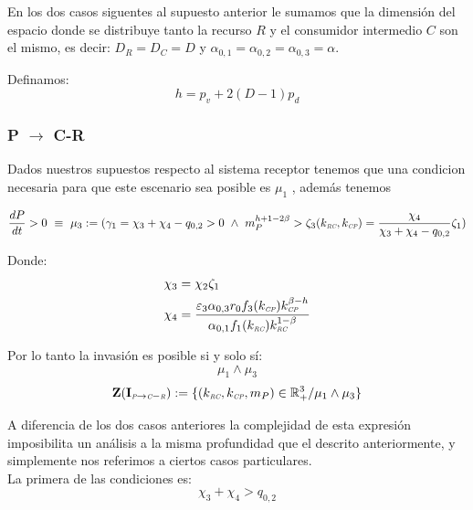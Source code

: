 En los dos casos siguentes al supuesto anterior le sumamos que la dimensi\'on del espacio donde se distribuye tanto la recurso $R$ y el consumidor intermedio $C$ son el mismo, es decir: $D_R = D_C = D$ y $\alpha_{0,1} = \alpha_{0,2} = \alpha_{0,3} = \alpha$.

Definamos:
\begin{equation}
  h = p_v + 2(D-1)p_d
\end{equation}

\subsubsection{P $\to$ C-R}
Dados nuestros supuestos respecto al sistema receptor tenemos que una condicion necesaria para que este escenario sea posible es $\mu_1$ , adem\'as tenemos

\begin{equation}
  \frac{dP}{dt}  >0 \ \equiv \  \mu_3 := (\gamma_1 = \chi_3 + \chi_4 - q_{0,2} >0 \ \land \ m_P^{h + 1 - 2\beta} > \zeta_3(k_{\textit{\tiny RC}},k_{\textit{\tiny CP}}) = \frac{\chi_4}{\chi_3 + \chi_4 - q_{0,2}}\zeta_1)
\end{equation}

Donde:
\begin{equation}\label{eq:3rdCond}
  \begin{aligned}
    \chi_3 &= \chi_2 \zeta_1 \\
    \chi_4 &= \frac{\varepsilon_3 \alpha_{0,3}r_0 f_3(k_{\textit{\tiny CP}})k_{\textit{\tiny CP}}^{\beta - h}}{\alpha_{0,1}f_1(k_{\textit{\tiny RC}})k_{\textit{\tiny RC}}^{1-\beta}}
  \end{aligned}
\end{equation}

Por lo tanto la invasi\'on es posible si y solo s\'i:
\begin{equation}
  \mu_1 \land \mu_3
\end{equation}
\begin{equation}
\mathbf{Z(I_{\textit{\tiny P} \to \textit{\tiny C}-\textit{\tiny R}})} := \{ (k_{\textit{\tiny RC}},k_{\textit{\tiny CP}},m_P) \in \mathbb{R}^3_+ / \mu_1 \land \mu_3 \}
\end{equation}

A diferencia de los dos casos anteriores la complejidad de esta expresi\'on imposibilita un an\'alisis a la misma profundidad que el descrito anteriormente, y simplemente nos referimos a ciertos casos particulares.\\

La primera de las condiciones es:
\begin{equation}
  \chi_3 + \chi_4 > q_{0,2}
\end{equation}

